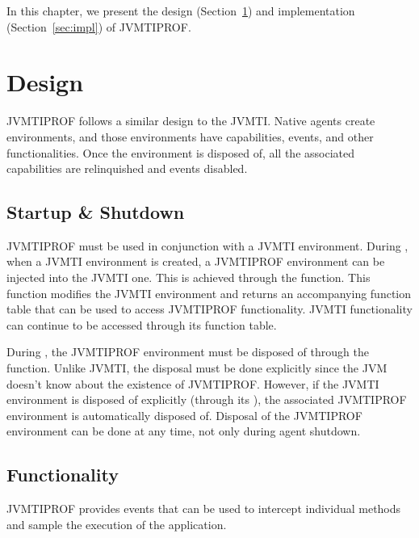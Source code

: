 
\label{cap:methodology}

In this chapter, we present the design (Section~\ref{sec:design}) and implementation (Section~\ref{sec:impl}) of JVMTIPROF.

\section{Design} \label{sec:design}

JVMTIPROF follows a similar design to the JVMTI. Native agents create environments, and those environments have capabilities, events, and other functionalities. Once the environment is disposed of, all the associated capabilities are relinquished and events disabled.

\subsection{Startup \& Shutdown}

JVMTIPROF must be used in conjunction with a JVMTI environment. During , when a JVMTI environment is created, a JVMTIPROF environment can be injected into the JVMTI one. This is achieved through the  function. This function modifies the JVMTI environment and returns an accompanying function table that can be used to access JVMTIPROF functionality. JVMTI functionality can continue to be accessed through its function table.

During , the JVMTIPROF environment must be disposed of through the  function. Unlike JVMTI, the disposal must be done explicitly since the JVM doesn't know about the existence of JVMTIPROF. However, if the JVMTI environment is disposed of explicitly (through its ), the associated JVMTIPROF environment is automatically disposed of. Disposal of the JVMTIPROF environment can be done at any time, not only during agent shutdown.

\subsection{Functionality}

JVMTIPROF provides events that can be used to intercept individual methods and sample the execution of the application.

